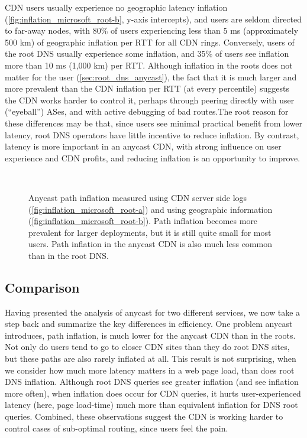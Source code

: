 \documentclass[sigconf,letterpaper,nonacm,10pt,anonymous]{acmart}
\begin{document}
CDN users usually experience no geographic latency inflation
(\cref{fig:inflation_microsoft_root-b}, y-axis intercepts), and users
are seldom directed to far-away nodes, with 80\% of users experiencing
less than 5 ms (approximately 500 km) of geographic inflation per RTT
for all CDN rings. Conversely, users of the root DNS usually experience
some inflation, and 35\% of users see inflation more than 10 ms (1,000
km) per RTT. Although inflation in the roots does not matter for the
user (\cref{sec:root_dns_anycast}), the fact that it is much larger and
more prevalent than the CDN inflation per RTT (at every percentile)
suggests the CDN works harder to control it, perhaps through peering
directly with user (``eyeball'') ASes, and with active debugging of bad
routes.The root reason for these differences may be that, since users
see minimal practical benefit from lower latency, root DNS operators
have little incentive to reduce inflation. By contrast, latency is more
important in an anycast CDN, with strong influence on user experience
and CDN profits, and reducing inflation is an opportunity to improve.

\begin{figure}
    \centering
     \\
    \caption{Anycast path inflation measured using CDN server side logs (\ref{fig:inflation_microsoft_root-a}) and using geographic information (\ref{fig:inflation_microsoft_root-b}). Path inflation becomes more prevalent for larger deployments, but it is still quite small for most users. Path inflation in the anycast CDN is also much less common than in the root DNS.}
    \label{fig:inflation_microsoft_root}
\end{figure}

\subsection{Comparison}\label{comparison-3}

Having presented the analysis of anycast for two different services, we
now take a step back and summarize the key differences in efficiency.
One problem anycast introduces, path inflation, is much lower for the
anycast CDN than in the roots. Not only do users tend to go to closer
CDN sites than they do root DNS sites, but these paths are also rarely
inflated at all. This result is not surprising, when we consider how
much more latency matters in a web page load, than does root DNS
inflation. Although root DNS queries see greater inflation (and see
inflation more often), when inflation does occur for CDN queries, it
hurts user-experienced latency (here, page load-time) much more than
equivalent inflation for DNS root queries. Combined, these observations
suggest the CDN is working harder to control cases of sub-optimal
routing, since users feel the pain.
\end{document}
